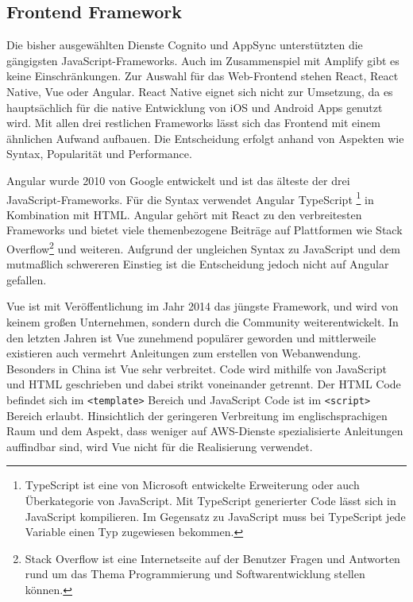 {\subsection{Frontend Framework}
Die bisher ausgewählten Dienste Cognito und AppSync unterstützten die gängigsten JavaScript-Frameworks.
Auch im Zusammenspiel mit Amplify gibt es keine Einschränkungen.
Zur Auswahl für das Web-Frontend stehen React, React Native, Vue oder Angular.
React Native eignet sich nicht zur Umsetzung, da es hauptsächlich für die native Entwicklung von iOS und Android Apps genutzt wird.
Mit allen drei restlichen Frameworks lässt sich das Frontend mit einem ähnlichen Aufwand aufbauen.
Die Entscheidung erfolgt anhand von Aspekten wie Syntax, Popularität und Performance.

Angular wurde 2010 von Google entwickelt und ist das älteste der drei JavaScript-Frameworks.
Für die Syntax verwendet Angular TypeScript
\footnote{TypeScript ist eine von Microsoft entwickelte Erweiterung oder auch Überkategorie von JavaScript.
Mit TypeScript generierter Code lässt sich in JavaScript kompilieren. Im Gegensatz zu JavaScript muss bei TypeScript jede Variable einen Typ zugewiesen bekommen.
 } in Kombination mit HTML.
 Angular gehört mit React zu den verbreitesten Frameworks und bietet viele themenbezogene Beiträge auf Plattformen wie Stack Overflow\footnote{Stack Overflow ist eine Internetseite auf der Benutzer Fragen und Antworten rund um das Thema Programmierung und Softwarentwicklung stellen können. } und weiteren.
Aufgrund der ungleichen Syntax zu JavaScript und dem mutmaßlich schwereren Einstieg ist die Entscheidung jedoch nicht auf Angular gefallen.

Vue ist mit Veröffentlichung im Jahr 2014 das jüngste Framework, und wird von keinem großen Unternehmen, sondern durch die Community weiterentwickelt.
In den letzten Jahren ist Vue zunehmend populärer geworden und mittlerweile existieren auch vermehrt Anleitungen zum erstellen von Webanwendung.
Besonders in China ist Vue sehr verbreitet.\cite[Abschnitt: Comparing Adoption \& Popularity]{JavascriptFrameworks}
Code wird mithilfe von JavaScript und HTML geschrieben und dabei strikt voneinander getrennt.
Der HTML Code befindet sich im \verb+<template>+ Bereich und JavaScript Code ist im \verb+<script>+ Bereich erlaubt.
Hinsichtlich der geringeren Verbreitung im englischsprachigen Raum und dem Aspekt, dass weniger auf AWS-Dienste spezialisierte Anleitungen auffindbar sind, wird Vue nicht für die Realisierung verwendet.

}
